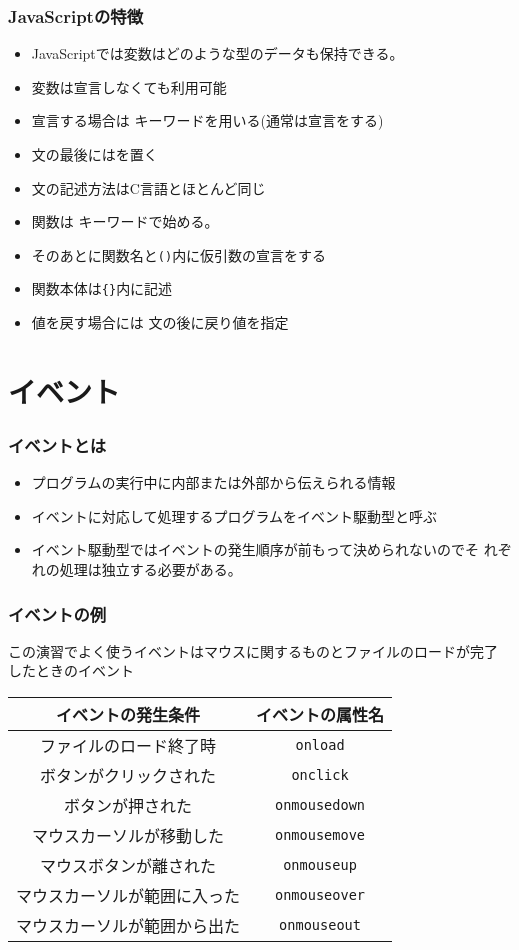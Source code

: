 \begin{frame}[containsverbatim]
 \frametitle{JavaScriptの特徴}
 \begin{itemize}
  \item JavaScriptでは変数はどのような型のデータも保持できる。
  \item 変数は宣言しなくても利用可能
  \item 宣言する場合は  キーワードを用いる(通常は宣言をする)
  \item 文の最後には\JSKey{;}を置く
  \item 文の記述方法はC言語とほとんど同じ
  \item 関数は  キーワードで始める。
  \item そのあとに関数名と\texttt{()}内に仮引数の宣言をする
  \item 関数本体は\texttt{\{\}}内に記述
  \item 値を戻す場合には 文の後に戻り値を指定
 \end{itemize}
\end{frame}
 \section{イベント}
\begin{frame}[containsverbatim]
 \frametitle{イベントとは}
 \begin{itemize}
  \item プログラムの実行中に内部または外部から伝えられる情報
  \item イベントに対応して処理するプログラムをイベント駆動型と呼ぶ
  \item イベント駆動型ではイベントの発生順序が前もって決められないのでそ
        れぞれの処理は独立する必要がある。
 \end{itemize}
\end{frame}
\newcommand{\Event}[1]{\texttt{#1}}
\begin{frame}[containsverbatim]
 \frametitle{イベントの例}
 この演習でよく使うイベントはマウスに関するものとファイルのロードが完了
 したときのイベント
\begin{center}
\begin{tabular}[t]{|c|c|}
 \hline
イベントの発生条件& イベントの属性名%
\\\hline
ファイルのロード終了時  &\Event{onload} \\ \hline
ボタンがクリックされた &\Event{onclick}  \\ \hline
ボタンが押された &\Event{onmousedown}  \\ \hline
マウスカーソルが移動した&\Event{onmousemove}  \\ \hline
マウスボタンが離された&  \Event{onmouseup} \\ \hline
マウスカーソルが範囲に入った&\Event{onmouseover}  \\ \hline
マウスカーソルが範囲から出た&\Event{onmouseout}  \\ \hline
\end{tabular} 
\end{center}
\end{frame}
